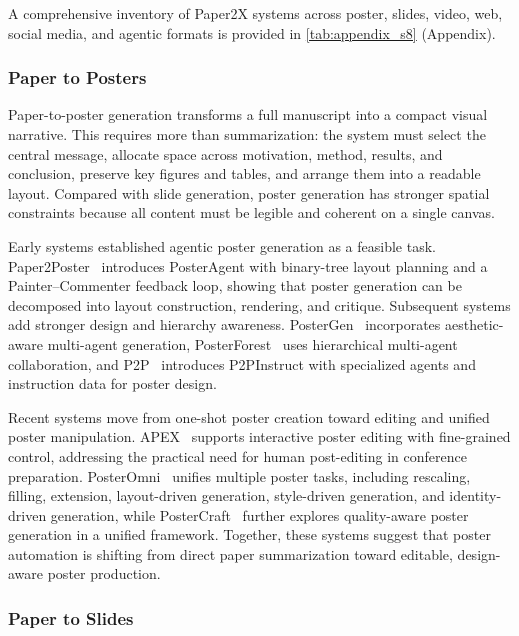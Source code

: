 A comprehensive inventory of Paper2X systems across poster, slides, video, web, social media, and agentic formats is provided in \cref{tab:appendix_s8} (Appendix).



\subsubsection{Paper to Posters}
\label{sec:paper2poster}

Paper-to-poster generation transforms a full manuscript into a compact visual narrative. This requires more than summarization: the system must select the central message, allocate space across motivation, method, results, and conclusion, preserve key figures and tables, and arrange them into a readable layout. Compared with slide generation, poster generation has stronger spatial constraints because all content must be legible and coherent on a single canvas.

Early systems established agentic poster generation as a feasible task. Paper2Poster~\cite{paper2poster2025} introduces PosterAgent with binary-tree layout planning and a Painter--Commenter feedback loop, showing that poster generation can be decomposed into layout construction, rendering, and critique. Subsequent systems add stronger design and hierarchy awareness. PosterGen~\cite{postergen2025} incorporates aesthetic-aware multi-agent generation, PosterForest~\cite{choi2025posterforest} uses hierarchical multi-agent collaboration, and P2P~\cite{p2p2025} introduces P2PInstruct with specialized agents and instruction data for poster design.

Recent systems move from one-shot poster creation toward editing and unified poster manipulation. APEX~\cite{apex2026} supports interactive poster editing with fine-grained control, addressing the practical need for human post-editing in conference preparation. PosterOmni~\cite{posteromni2026} unifies multiple poster tasks, including rescaling, filling, extension, layout-driven generation, style-driven generation, and identity-driven generation, while PosterCraft~\cite{postercraft2026} further explores quality-aware poster generation in a unified framework. Together, these systems suggest that poster automation is shifting from direct paper summarization toward editable, design-aware poster production.



\subsubsection{Paper to Slides}
\label{sec:paper2slides}

